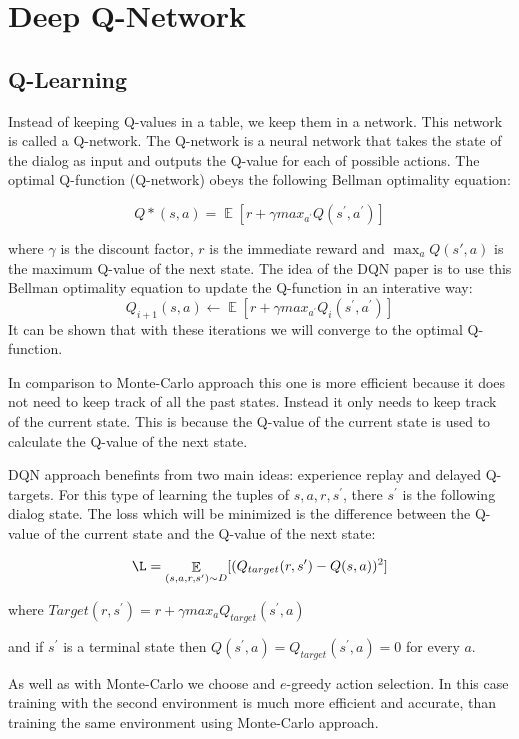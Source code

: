 \documentclass[12pt,titlepage,a4paper]{article}
\DeclareMathOperator*{\E}{\mathbb{E}}
\begin{document}
\pagebreak


\section{Deep Q-Network}

\subsection{Q-Learning}
Instead of keeping Q-values in a table, we keep them in a network. This network is called a Q-network. The Q-network is a neural network that takes the state of the dialog as input and outputs the Q-value for each of possible actions. The optimal Q-function (Q-network) obeys the following Bellman optimality equation: 

\[ Q*(s,a) = \E [r + \gamma max_{a^\prime}Q(s^\prime,a^\prime)] \] 

where $\gamma$ is the discount factor,  $r$ is the immediate reward and $\max_a Q(s',a)$ is the maximum Q-value of the next state. The idea of the DQN paper is to use this Bellman optimality equation to update the Q-function in an interative way:
\[Q_{i + 1} (s,a) \leftarrow \E[r + \gamma max_{a^\prime}Q_{i}(s^\prime,a^\prime)]\]
It can be shown that with these iterations we will converge to the optimal Q-function.

In comparison to Monte-Carlo approach this one is more efficient because it does not need to keep track of all the past states. Instead it only needs to keep track of the current state. This is because the Q-value of the current state is used to calculate the Q-value of the next state.

DQN approach benefints from two main ideas: experience replay and delayed Q-targets. For this type of learning the tuples of ${s, a, r, s^\prime}$, there $s^\prime$ is the following dialog state. The loss which will be minimized is the difference between the Q-value of the current state and the Q-value of the next state:

\[\L = \E_{(s, a, r, s^\prime) \sim D} [(Q_{target}(r,s^\prime) - Q(s, a))^2]\]

where $Target(r, s^\prime) = r + \gamma max_{a}Q_{target}(s^\prime,a)$

and if $s^\prime$ is a terminal state then $Q(s^\prime, a) = Q_{target}(s^\prime, a) = 0$ for every $a$.
 
As well as with Monte-Carlo we choose and $e$-greedy action selection. In this case training with the second environment is much more efficient and accurate, than training the same environment using Monte-Carlo approach. 
\end{document}
